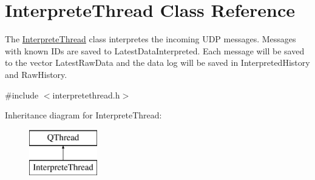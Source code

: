 \hypertarget{class_interprete_thread}{}\section{Interprete\+Thread Class Reference}
\label{class_interprete_thread}


The \hyperlink{class_interprete_thread}{Interprete\+Thread} class interpretes the incoming U\+D\+P messages. Messages with known I\+D\textquotesingle{}s are saved to Latest\+Data\+Interpreted. Each message will be saved to the vector Latest\+Raw\+Data and the data log will be saved in Interpreted\+History and Raw\+History.  




{\ttfamily \#include $<$interpretethread.\+h$>$}

Inheritance diagram for Interprete\+Thread\+:\begin{figure}[H]
\begin{center}
\leavevmode
\includegraphics[height=2.000000cm]{class_interprete_thread}
\end{center}
\end{figure}
